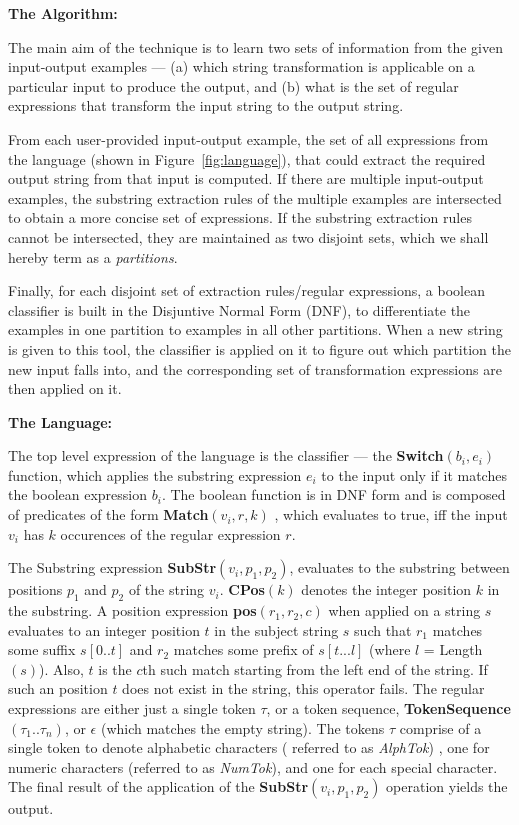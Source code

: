 {\bf The Algorithm:}

The main aim of the technique is to learn two sets of information from the given input-output examples --- (a) which string transformation is applicable on a particular input to produce the output, and (b) what is the set of regular expressions that transform the input string to the output string.

From each user-provided input-output example, the set of all expressions from the language (shown in Figure~\ref{fig:language}), that could extract the required output string from that input is computed. If there are multiple input-output examples, the substring extraction rules of the multiple examples are intersected to obtain a more concise set of expressions. If the substring extraction rules cannot be intersected, they are maintained as two disjoint sets, which we shall hereby term as a {\it partitions}. 

Finally, for each disjoint set of extraction rules/regular expressions, a boolean classifier is built in the Disjuntive Normal Form (DNF), to differentiate the examples in one partition to examples in all other partitions. When a new string is given to this tool, the classifier is applied on it to figure out which partition the new input falls into, and the corresponding set of transformation expressions are then applied on it.

{\bf The Language:}

The top level expression of the language is the classifier --- the {\bf Switch}$(b_i,e_i)$ function, which applies the substring expression $e_i$ to the input only if it matches the boolean expression $b_i$. The boolean function is in DNF form and is composed of predicates of the form {\bf Match}$(v_i,r,k)$ , which evaluates to true, iff the input $v_i$ has $k$ occurences of the regular expression $r$.

The Substring expression {\bf SubStr}$(v_i,p_1,p_2)$, evaluates to the substring between positions $p_1$ and $p_2$ of the string $v_i$. {\bf CPos}$(k)$ denotes the integer position $k$ in the substring. A position expression {\bf pos}$(r_1,r_2,c)$ when applied on a string $s$ evaluates to an integer position $t$ in the subject string $s$ such that $r_1$ matches some suffix $s[0 ..t]$ and $r_2$ matches some prefix of $s[t ... l]$ (where $l$ = Length$(s)$). Also, $t$ is the $c$th such match starting from the left end of the string. If such an position $t$ does not exist in the string, this operator fails. The regular expressions are either just a single token $\tau$, or a token sequence, {\bf TokenSequence}$(\tau_1 .. \tau_n)$, or $\epsilon$ (which matches the empty string). The tokens $\tau$ comprise of a single token to denote alphabetic characters ( referred to as {\it AlphTok}) , one for numeric characters (referred to as {\it NumTok}), and one for each special character. The final result of the application of the {\bf SubStr}$(v_i,p_1,p_2)$ operation yields the output.

